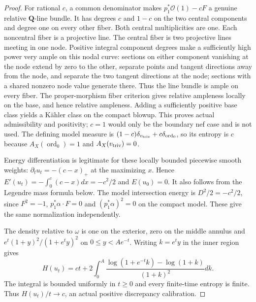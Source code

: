 \documentclass[11pt]{article}
\newcommand{\ord}{\operatorname{ord}}
\theoremstyle{remark}\newtheorem{remark}[theorem]{Remark}
\begin{document}
\begin{proof}
For rational $c$, a common denominator makes
$p_1^*\mathcal O(1)-cF$ a genuine relative $\mathbf Q$-line bundle.
It has degrees $c$ and $1-c$ on the two central components and
degree one on every other fiber. Both central multiplicities are one.
Each noncentral fiber is a projective line. The central fiber is two
projective lines meeting in one node. Positive integral component
degrees make a sufficiently high power very ample on this nodal
curve: sections on either component vanishing at the node extend by
zero to the other, separate points and tangent directions away from
the node, and separate the two tangent directions at the node;
sections with a shared nonzero node value generate there.
Thus the line bundle is ample on every fiber. The proper-morphism
fiber criterion \cite{Stacks} gives relative ampleness locally on the
base, and hence relative ampleness. Adding a sufficiently positive
base class yields a K\"ahler
class on the compact blowup. This proves actual admissibility and
positivity; $c=1$ would only be the boundary nef case and is not used.
The defining model measure is
$(1-c)\delta_{v_{\rm triv}}+c\delta_{\ord_0}$, so its entropy is
$c$ because $A_X(\ord_0)=1$ and $A_X(v_{\rm triv})=0$.

Energy differentiation is legitimate for these locally bounded
piecewise smooth weights: $\partial_tu_t=-(c-x)_+$ at the maximizing
$x$. Hence $E'(u_t)=-\int_0^c(c-x)dx=-c^2/2$ and $E(u_0)=0$.
It also follows from the Legendre mass formula below. The model
intersection energy is $D^2/2=-c^2/2$, since $F^2=-1$,
$p_1^*\alpha\cdot F=0$ and $(p_1^*\alpha)^2=0$ on the compact
model. These give the same normalization independently.

The density relative to $\omega$ is one on the exterior, zero on
the middle annulus and
$e^t(1+y)^2/(1+e^t y)^2$ on $0\leq y<Ae^{-t}$.
Writing $k=e^ty$ in the inner region gives
\[
 H(u_t)=ct+2\int_0^A
       \frac{\log(1+e^{-t}k)-\log(1+k)}{(1+k)^2}dk.
\]
The integral is bounded uniformly in $t\geq0$ and every finite-time
entropy is finite. Thus $H(u_t)/t\to c$, an actual positive
discrepancy calibration.


\end{proof}
\end{document}
